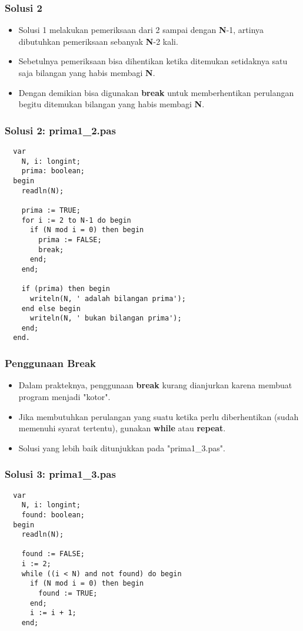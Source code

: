 \begin{frame}
\frametitle{Solusi 2}
\begin{itemize}
  \item Solusi 1 melakukan pemeriksaan dari 2 sampai dengan \textbf{N}-1, artinya dibutuhkan pemeriksaan sebanyak \textbf{N}-2 kali.
  \item Sebetulnya pemeriksaan bisa dihentikan ketika ditemukan setidaknya satu saja bilangan yang habis membagi \textbf{N}.
  \item Dengan demikian bisa digunakan \textbf{break} untuk memberhentikan perulangan begitu ditemukan bilangan yang habis membagi \textbf{N}.
\end{itemize}
\end{frame}

\begin{frame}[fragile]
\frametitle{Solusi 2: prima1\_2.pas}
\begin{lstlisting}
  var
    N, i: longint;
    prima: boolean;
  begin
    readln(N);

    prima := TRUE;
    for i := 2 to N-1 do begin
      if (N mod i = 0) then begin
        prima := FALSE;
        break;
      end;
    end;

    if (prima) then begin
      writeln(N, ' adalah bilangan prima');
    end else begin
      writeln(N, ' bukan bilangan prima');
    end;
  end.
\end{lstlisting}
\end{frame}

\begin{frame}
\frametitle{Penggunaan Break}
\begin{itemize}
  \item Dalam prakteknya, penggunaan \textbf{break} kurang dianjurkan karena membuat program menjadi "kotor".
  \item Jika membutuhkan perulangan yang suatu ketika perlu diberhentikan (sudah memenuhi syarat tertentu), gunakan \textbf{while} atau \textbf{repeat}.
  \item Solusi yang lebih baik ditunjukkan pada "prima1\_3.pas".
\end{itemize}
\end{frame}

\begin{frame}[fragile]
\frametitle{Solusi 3: prima1\_3.pas}
\begin{lstlisting}
  var
    N, i: longint;
    found: boolean;
  begin
    readln(N);

    found := FALSE;
    i := 2;
    while ((i < N) and not found) do begin
      if (N mod i = 0) then begin
        found := TRUE;
      end;
      i := i + 1;
    end;
\end{lstlisting}
\end{frame}

